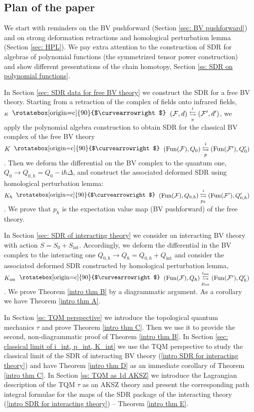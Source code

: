 \documentclass{amsart}
\theoremstyle{plain} %
\theoremstyle{definition}
\theoremstyle{remark}
\newcommand{\mr}{\mathrm}
\newcommand{\ra}{\rightarrow}
\newcommand{\F}{\mathcal{F}}
\newcommand{\ii}{\mathrm{int}}
\newcommand{\iii}{\mathrm{i}}
\newcommand{\SDR}[5]{#5\;\;\raisebox{1.3pt}{\rotatebox[origin=c]{90}{$\curvearrowright$}}\;\; #1 \underset{#4}{\stackrel{#3}{\leftrightarrows}} #2}  %
\begin{document}
\subsection{Plan of the paper}
We start with reminders on the BV pushforward (Section \ref{sec: BV pushforward}) and on strong deformation retractions and homological perturbation lemma (Section \ref{sec: HPL}). We pay extra attention to the construction of SDR for algebras of polynomial functions (the symmetrized tensor power construction) and show different presentations of the chain homotopy, Section \ref{ss: SDR on polynomial functions}. 

In Section \ref{sec: SDR data for free BV theory} we construct the SDR for a free BV theory. Starting from a retraction of the complex of fields onto infrared fields, 
$\SDR{(\F,d)}{(\F',d')}{\iota}{\pi}{\kappa}$, we apply the polynomial algebra construction to obtain SDR for the classical BV complex of the free BV theory $\SDR{(\mr{Fun}(\F),Q_0)}{(\mr{Fun}(\F'),Q'_0)}{i}{p}{K}$. Then we deform the differential on the BV complex to the quantum one, $Q_0\ra Q_{0,\hbar}=Q_0-\iii\hbar\Delta$, and construct the associated deformed SDR using homological perturbation lemma: 
$\SDR{(\mr{Fun}(\F),Q_{0,\hbar})}{(\mr{Fun}(\F'),Q'_{0,\hbar})}{i}{p_\hbar}{K_\hbar}$. We prove that $p_\hbar$ is the expectation value map (BV pushforward) of the free theory.

In Section \ref{sec: SDR of interacting theory} we consider an interacting BV theory with action $S=S_0+S_\mr{int}$. Accordingly, we deform the differential in the BV complex to the interacting one $Q_{0,\hbar}\ra Q_\hbar=Q_{0,\hbar}+Q_\ii$ and consider the associated deformed SDR constructed by homological perturbation lemma, $\SDR{(\mr{Fun}(\F),Q_\hbar)}{(\mr{Fun}(\F'),Q'_\hbar)}{i_\ii}{p_\ii}{K_\ii}$. We prove Theorem \ref{intro thm B} %
by a diagrammatic argument. As a corollary we have Theorem \ref{intro thm A}.

In Section \ref{ss: TQM perspective} we introduce the topological quantum mechanics $\tau$ and prove Theorem \ref{intro thm C}. Then we use it to provide the second, non-diagrammatic proof of Theorem \ref{intro thm B}.
In Section \ref{sec: classical limit of i_int, p_int, K_int} we use the TQM perspective to study the classical limit of the SDR of interacting BV theory (\ref{intro SDR for interacting theory}) and have Theorem \ref{intro thm D} as an immediate corollary of Theorem \ref{intro thm C}.
In Section \ref{ss: TQM as 1d AKSZ} we introduce the Lagrangian description of the TQM $\tau$ as an AKSZ theory and present the corresponding path integral formulae for the maps of the SDR package of the interacting theory (\ref{intro SDR for interacting theory}) -- Theorem \ref{intro thm E}. %
\end{document}

